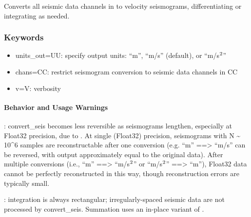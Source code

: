 \documentclass[letterpaper,11pt,english]{sphinxmanual}
\begin{document}
\begin{fulllineitems}
\end{fulllineitems}


Converts all seismic data channels in  to velocity seismograms,
differentiating or integrating as needed.


\subsubsection{Keywords}
\label{\detokenize{src/Processing/processing:keywords}}\begin{itemize}
\item {} 
units\_out=UU: specify output units: “m”, “m/s” (default), or “m/s\(\sp{\text{2}}\)”

\item {} 
chans=CC: restrict seismogram conversion to seismic data channels in CC

\item {} 
v=V: verbosity

\end{itemize}


\paragraph{Behavior and Usage Warnings}
\label{\detokenize{src/Processing/processing:behavior-and-usage-warnings}}
: convert\_seis becomes less reversible as seismograms lengthen,
especially at Float32 precision, due to .
At single (Float32) precision, seismograms with N \textasciitilde{} 10\textasciicircum{}6 samples are
reconstructable after one conversion (e.g. “m” ==\textgreater{} “m/s” can be reversed, with
output approximately equal to the original data). After multiple conversions
(i.e., “m” ==\textgreater{} “m/s\(\sp{\text{2}}\)” or “m/s\(\sp{\text{2}}\)” ==\textgreater{} “m”), Float32 data cannot be perfectly
reconstructed in this way, though reconstruction errors are typically small.

: integration is always rectangular; irregularly-spaced
seismic data are not processed by convert\_seis. Summation uses an in-place
variant of .
\end{document}
